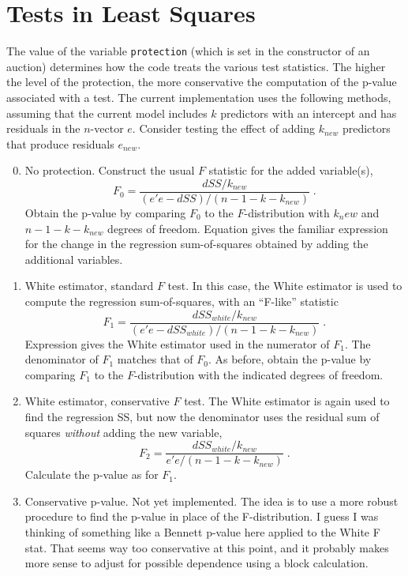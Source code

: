 \documentclass[12pt]{article}
\begin{document}
\section{Tests in Least Squares} %

 The value of the variable {\tt protection} (which is set in the constructor of
 an auction) determines how the code treats the various test statistics.  The
 higher the level of the protection, the more conservative the computation of
 the p-value associated with a test.  The current implementation uses the
 following methods, assuming that the current model includes $k$ predictors
 with an intercept and has residuals in the $n$-vector $e$.  Consider testing
 the effect of adding $k_{new}$ predictors that produce residuals $e_{new}$.

\begin{enumerate}
\setcounter{enumi}{-1}

\item No protection.  Construct the usual $F$ statistic for the added
 variable(s),
\begin{equation}
    F_0 = \frac{ dSS/k_{new} }{(e'e-dSS)/(n-1-k-k_{new})} \;.
\label{eq:f0}
\end{equation}
 Obtain the p-value by comparing $F_0$ to the $F$-distribution with $k_new$ and
 $n-1-k-k_{new}$ degrees of freedom.  Equation  gives the familiar
 expression for the change in the regression sum-of-squares obtained by adding
 the additional variables.

\item White estimator, standard $F$ test. In this case, the White estimator is
 used to compute the regression sum-of-squares, with an ``F-like'' statistic
\begin{equation}
    F_1 = \frac{ dSS_{white}/k_{new} }{(e'e-dSS_{white})/(n-1-k-k_{new})} \;.
\label{eq:f1}
\end{equation}
 Expression  gives the White estimator used in the numerator of
 $F_1$.  The denominator of $F_1$ matches that of $F_0$.  As before, obtain the
 p-value by comparing $F_1$ to the $F$-distribution with the indicated degrees
 of freedom.

\item White estimator, conservative $F$ test. The White estimator is again used
 to find the regression SS, but now the denominator uses the residual sum of
 squares {\em without} adding the new variable,
\begin{equation}
    F_2 = \frac{ dSS_{white}/k_{new} }{e'e/(n-1-k-k_{new})} \;.
\label{eq:fstat}
\end{equation}
 Calculate the p-value as for $F_1$.

\item Conservative p-value.  Not yet implemented.  The idea is to use a more
 robust procedure to find the p-value in place of the F-distribution.  I guess I
 was thinking of something like a Bennett p-value here applied to the White F
 stat.  That seems way too conservative at this point, and it probably makes
 more sense to adjust for possible dependence using a block calculation.

\end{enumerate}
\end{document}
